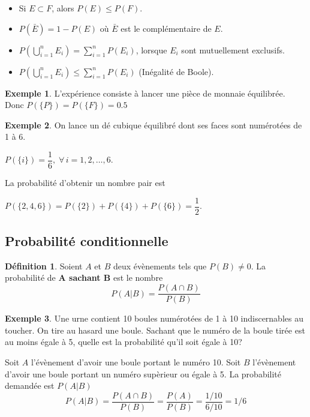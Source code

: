 \documentclass[
]{book}
\providecommand{\tightlist}{%
  \setlength{\itemsep}{0pt}\setlength{\parskip}{0pt}}
\theoremstyle{definition}
\newtheorem{definition}{Définition}[chapter]
\theoremstyle{definition}
\newtheorem{example}{Exemple}[chapter]
\theoremstyle{definition}
\theoremstyle{remark}
\begin{document}
\begin{itemize}
\tightlist
\item
  Si \(E \subset F\), alors \(P(E) \leq P(F)\).
\item
  \(P ( \bar{E})=1-P(E)\) où \(\bar{E}\) est le complémentaire de \(E\).
\item
  \(P \left(\bigcup\limits_{i=1}^nE_i \right)=\displaystyle\sum_{i=1}^n P(E_i)\), lorsque \(E_i\) sont mutuellement exclusifs.
\item
  \(P \left(\bigcup\limits_{i=1}^nE_i \right)\leq\displaystyle \sum_{i=1}^n P(E_i)\) (Inégalité de Boole).
\end{itemize}

\begin{example}
\protect\hypertarget{exm:unnamed-chunk-3}{}{\label{exm:unnamed-chunk-3} }L'expérience consiste à lancer une pièce de monnaie équilibrée. Donc \(P(\{P\})= P(\{F\})=0.5\)
\end{example}

\begin{example}
\protect\hypertarget{exm:unnamed-chunk-4}{}{\label{exm:unnamed-chunk-4} }On lance un dé cubique équilibré dont ses faces sont numérotées de 1 à 6.

\(P(\{i \})= \dfrac{1}{6}, \; \forall\, i=1,2,\ldots,6\).

La probabilité d'obtenir un nombre pair est

\(P(\{2,4,6\})= P(\{2 \})+P(\{4 \}) +P(\{6 \}) = \dfrac{1}{2}\).
\end{example}

\hypertarget{probabilituxe9-conditionnelle}{%
\subsection{Probabilité conditionnelle}\label{probabilituxe9-conditionnelle}}

\begin{definition}
\protect\hypertarget{def:unnamed-chunk-5}{}{\label{def:unnamed-chunk-5} }Soient \(A\) et \(B\) deux évènements tels que \(P(B)\neq0\). La probabilité de \textbf{A sachant B} est le nombre
\[
  P(A|B)=\frac{P(A \cap B)}{P(B)}
\]
\end{definition}

\begin{example}
\protect\hypertarget{exm:unnamed-chunk-6}{}{\label{exm:unnamed-chunk-6} }Une urne contient 10 boules numérotées de 1 à 10 indiscernables au toucher. On tire au hasard une boule. Sachant que le numéro de la boule tirée est au moins égale à 5, quelle est la probabilité qu'il soit égale à 10?

Soit \(A\) l'évènement d'avoir une boule portant le numéro 10. Soit \(B\) l'évènement d'avoir une boule portant un numéro supèrieur ou égale à 5. La probabilité demandée est \(P(A|B)\)
\[
P(A|B)=\frac{P(A \cap B)}{P(B)}=\frac{P(A)}{P(B)}=\frac{1/10}{6/10}=1/6
\]
\end{example}
\end{document}
